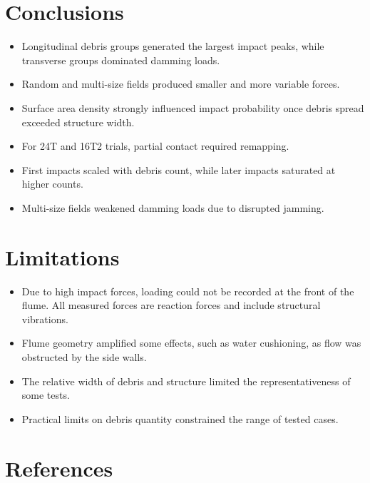 \documentclass{article}
\begin{document}
\section{Conclusions}
\begin{itemize}
    \item Longitudinal debris groups generated the largest impact peaks, while transverse groups dominated damming loads.
    \item Random and multi-size fields produced smaller and more variable forces.
    \item Surface area density strongly influenced impact probability once debris spread exceeded structure width.
    \item For 24T and 16T2 trials, partial contact required remapping.
    \item First impacts scaled with debris count, while later impacts saturated at higher counts.
    \item Multi-size fields weakened damming loads due to disrupted jamming.
\end{itemize}

\section{Limitations}
\begin{itemize}
    \item Due to high impact forces, loading could not be recorded at the front of the flume. All measured forces are reaction forces and include structural vibrations.
    \item Flume geometry amplified some effects, such as water cushioning, as flow was obstructed by the side walls.
    \item The relative width of debris and structure limited the representativeness of some tests.
    \item Practical limits on debris quantity constrained the range of tested cases.
\end{itemize}
\section{References}
\end{document}
